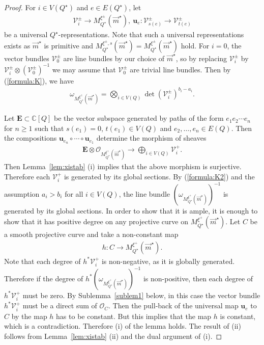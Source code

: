 \documentclass[11pt]{amsart}
\theoremstyle{plain}
\theoremstyle{definition}
\theoremstyle{remark}
\newcommand{\oO}{\mathcal{O}}
\newcommand{\vV}{\mathcal{V}}
\begin{document}
\begin{proof}
For $i \in V(Q^{\star})$ and $e \in E(Q^{\star})$, let
\begin{align*}
\vV_i^{\pm} \to M_{Q^{\star}}^{\xi^{\pm}}(\vec{m}^{\star}), \ 
\mathbf{u}_{e} \colon \vV_{s(e)}^{\pm} \to \vV_{t(e)}^{\pm}
\end{align*}
be a universal $Q^{\star}$-representations. 
Note that such a universal representations exists
as $\vec{m}^{\star}$ is primitive and 
$M_{Q^{\star}}^{\xi^{\pm}, s}(\vec{m}^{\star})
=M_{Q^{\star}}^{\xi^{\pm}}(\vec{m}^{\star})$ hold. 
For $i=0$, the vector bundles 
$\vV_0^{\pm}$ are line bundles by 
our choice of $\vec{m}^{\star}$, so by 
replacing $\vV_i^{\pm}$
by $\vV_i^{\pm} \otimes (\vV_0^{\pm})^{-1}$ we may 
assume that $\vV_0^{\pm}$ are trivial line bundles.   
Then by (\ref{formula:K}), we have 
\begin{align}\label{formula:K2}
\omega_{M_{Q^{\star}}^{\xi^{\pm}}(\vec{m}^{\star})}
=\bigotimes_{i \in V(Q)} \det (\vV_i^{\pm})^{b_i-a_i}.
\end{align}

Let $\mathbf{E} \subset \mathbb{C}[Q]$ be the 
vector subspace generated by paths of the form
$e_1 e_2 \cdots e_n$ for $n\ge 1$ such
that $s(e_1) =0$, $t(e_1) \in V(Q)$
and $e_2, \ldots, e_n \in E(Q)$. 
Then the compositions
$\mathbf{u}_{e_n} \circ \cdots \circ \mathbf{u}_{e_1}$
determine the morphism of sheaves
\begin{align*}
\mathbf{E} \otimes \oO_{M_{Q^{\star}}^{\xi^{+}}(\vec{m}^{\star})}
\to \bigoplus_{i\in V(Q)} \vV_i^{+}. 
\end{align*}
Then Lemma~\ref{lem:xistab} (i) implies that 
the above morphism is surjective. 
Therefore each $\vV_i^{+}$ is generated by 
its global sections. 
By (\ref{formula:K2})
and the assumption $a_i>b_i$ for all $i\in V(Q)$, 
the line bundle 
$(\omega_{M_{Q^{\star}}^{\xi^{+}}(\vec{m}^{\star})})^{-1}$
is generated by its global sections. 
In order to show that it is ample, it is enough to show that 
it has positive degree on any projective curve 
on $M_{Q^{\star}}^{\xi^{+}}(\vec{m}^{\star})$. 
Let $C$ be a smooth projective curve and 
take a non-constant map
\begin{align*}h \colon C \to M_{Q^{\star}}^{\xi^{+}}(\vec{m}^{\star}).
\end{align*}
Note that each degree of $h^{\ast}\vV_i^{+}$
is non-negative, as it is globally generated. 
Therefore
if the degree of 
$h^{\ast}(\omega_{M_{Q^{\star}}^{\xi^{+}}(\vec{m}^{\star})})^{-1}$
is non-positive, then 
each degree of $h^{\ast}\vV_i^{+}$
must be zero. 
By Sublemma~\ref{sublem1} below, 
in this case
the vector bundle $h^{\ast}\vV_i^{+}$ 
must be a direct
sum of $\oO_C$. 
Then the pull-back of 
the universal map $\mathbf{u}_e$ to $C$
by the map $h$ has to be constant. 
But this implies that the map 
$h$ is constant, which is a contradiction. 
Therefore (i) of the lemma holds. 
The result of (ii) follows from 
Lemma~\ref{lem:xistab} (ii) and the dual argument of (i). 
\end{proof}
\end{document}
